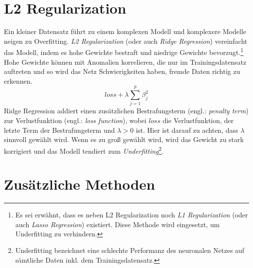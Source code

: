 \section{L2 Regularization}

Ein kleiner Datensatz führt zu einem komplexen Modell und komplexere Modelle neigen zu Overfitting. \textit{L2 Regularization} (oder auch \textit{Ridge Regression}) vereinfacht das Modell, indem es hohe Gewichte bestraft und niedrige Gewichte bevorzugt.\footnote{Es sei erwähnt, dass es neben L2 Regularization noch \textit{L1 Regularization} (oder auch \textit{Lasso Regression}) existiert. Diese Methode wird eingesetzt, um Underfitting zu verhindern.} Hohe Gewichte können mit Anomalien korrelieren, die nur im Trainingsdatensatz auftreten und so wird das Netz Schwierigkeiten haben, fremde Daten richtig zu erkennen. 
\begin{equation}\label{equation:l2}
	loss + \lambda\sum_{j=1}^p\beta_j^2
\end{equation}
Ridge Regression addiert einen zusätzlichen Bestrafungsterm (engl.: \textit{penalty term}) zur Verlustfunktion (engl.: \textit{loss function}), wobei $loss$ die Verlustfunktion, der letzte Term der Bestrafungsterm und $\lambda > 0$ ist. Hier ist darauf zu achten, dass $\lambda$ sinnvoll gewählt wird. Wenn es zu groß gewählt wird, wird das Gewicht zu stark korrigiert und das Modell tendiert zum \textit{Underfitting}\footnote{Underfitting bezeichnet eine schlechte Performanz des neuronalen Netzes auf sämtliche Daten inkl. dem Trainingsdatensatz.}.\cite{ref:regulization:nagpal}\cite{ref:regulization:gupta}

\section{Zusätzliche Methoden}


